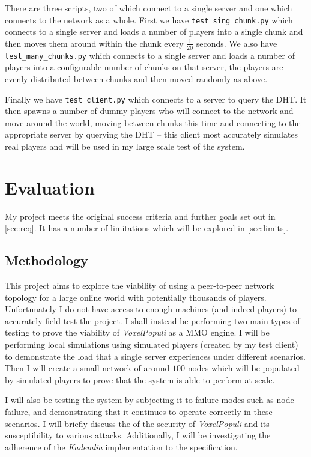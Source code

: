 \documentclass[10pt,twoside,notitlepage,a4paper]{report}
\newcommand{\kademlia}{\emph{Kademlia}}
\newcommand{\voxpop}{\emph{VoxelPopuli}}
\begin{document}
	There are three scripts, two of which connect to a single server and one which connects to the network as a whole. First we have {\tt test\_sing\_chunk.py} which connects to a single server and loads a number of players into a single chunk and then moves them around within the chunk every $\frac{1}{20}$ seconds. We also have {\tt test\_many\_chunks.py} which connects to a single server and loads a number of players into a configurable number of chunks on that server, the players are evenly distributed between chunks and then moved randomly as above.
	
	Finally we have {\tt test\_client.py} which connects to a server to query the DHT. It then spawns a number of dummy players who will connect to the network and move around the world, moving between chunks this time and connecting to the appropriate server by querying the DHT -- this client most accurately simulates real players and will be used in my large scale test of the system.
		
	\cleardoublepage
	\chapter{Evaluation}
	My project meets the original success criteria and further goals set out in \cref{sec:req}. It has a number of limitations which will be explored in \cref{sec:limits}.
	
	\section{Methodology}
	This project aims to explore the viability of using a peer-to-peer network topology for a large online world with potentially thousands of players. Unfortunately I do not have access to enough machines (and indeed players) to accurately field test the project. I shall instead be performing two main types of testing to prove the viability of \voxpop{} as a MMO engine. I will be performing local simulations using simulated players (created by my test client) to demonstrate the load that a single server experiences under different scenarios. Then I will create a small network of around $100$ nodes which will be populated by simulated players to prove that the system is able to perform at scale.
	
	I will also be testing the system by subjecting it to failure modes such as node failure, and demonstrating that it continues to operate correctly in these scenarios. I will briefly discuss the of the security of \voxpop{} and its susceptibility to various attacks. Additionally, I will be investigating the adherence of the \kademlia{} implementation to the specification.
	
\end{document}
